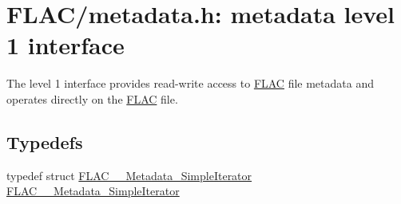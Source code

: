 \hypertarget{group__flac__metadata__level1}{}\section{F\+L\+A\+C/metadata.h\+: metadata level 1 interface}
\label{group__flac__metadata__level1}


The level 1 interface provides read-\/write access to \hyperlink{namespace_f_l_a_c}{F\+L\+AC} file metadata and operates directly on the \hyperlink{namespace_f_l_a_c}{F\+L\+AC} file.  


\subsection*{Typedefs}
\begin{DoxyCompactItemize}
\item 
typedef struct \hyperlink{struct_f_l_a_c_____metadata___simple_iterator}{F\+L\+A\+C\+\_\+\+\_\+\+Metadata\+\_\+\+Simple\+Iterator} \hyperlink{group__flac__metadata__level1_ga6accccddbb867dfc2eece9ee3ffecb3a}{F\+L\+A\+C\+\_\+\+\_\+\+Metadata\+\_\+\+Simple\+Iterator}
\end{DoxyCompactItemize}
